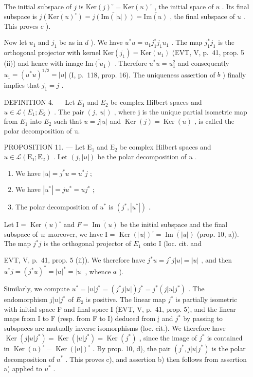 The initial subspace of \(j\) is \(\mathrm{Ker}(j)^{\circ} = \mathrm{Ker}(u)^{\circ}\) , the initial space of \(u\) . Its final subspace is \(\overline{j(\mathrm{Ker}(u)^{\circ})} = \overline{j(\mathrm{Im}(|u|))} = \overline{\mathrm{Im}(u)}\) , the final subspace of \(u\) . This proves \(c\) ).

Now let \(u_1\) and \(j_1\) be as in \(d\) ). We have \(u^*u = u_1j_1^*j_1u_1\) . The map \(j_1^*j_1\) is the orthogonal projector with kernel \(\text{Ker}(j_1) = \text{Ker}(u_1)\) (EVT, V, p.~41, prop. 5 (ii)) and hence with image \(\overline{\text{Im}(u_1)}\) . Therefore \(u^*u = u_1^2\) and consequently \(u_1 = (u^*u)^{1/2} = |u|\) (I, p.~118, prop. 16). The uniqueness assertion of \(b\) ) finally implies that \(j_1 = j\) .

DEFINITION 4. --- Let \(E_{1}\) and \(E_{2}\) be complex Hilbert spaces and \(u \in \mathcal{L}(E_{1}; E_{2})\) . The pair \((j, |u|)\) , where j is the unique partial isometric map from \(E_{1}\) into \(E_{2}\) such that \(u = j|u|\) and \(\operatorname{Ker}(j) = \operatorname{Ker}(u)\) , is called the polar decomposition of u.

PROPOSITION 11. — Let \(\mathrm{E}_1\) and \(\mathrm{E}_2\) be complex Hilbert spaces and \(u \in \mathcal{L}(\mathrm{E}_1; \mathrm{E}_2)\) . Let \((j, |u|)\) be the polar decomposition of \(u\) .

\begin{enumerate}
\def\labelenumi{\alph{enumi})}
\item
  We have \(|u| = j^{*}u = u^{*}j\) ;
\item
  We have \(|u^{*}| = j u^{*} = u j^{*}\) ;
\item
  The polar decomposition of \(u^{*}\) is \((j^{*}, |u^{*}|)\) .
\end{enumerate}

Let I = \(\operatorname{Ker}(u)^{\circ}\) and \(F = \overline{\operatorname{Im}(u)}\) be the initial subspace and the final subspace of u; moreover, we have I = \(\operatorname{Ker}(|u|)^{\circ} = \overline{\operatorname{Im}(|u|)}\) (prop. 10, a)). The map \(j^{*}j\) is the orthogonal projector of \(E_{1}\) onto I (loc. cit. and

EVT, V, p.~41, prop. 5 (ii)). We therefore have \(j^{*}u = j^{*}j|u| = |u|\) , and then \(u^{*}j = (j^{*}u)^{*} = |u|^{*} = |u|\) , whence \(a\) ).

Similarly, we compute \(u^{*} = |u|j^{*} = (j^{*}j|u|)j^{*} = j^{*}(j|u|j^{*})\) . The endomorphism \(j|u|j^{*}\) of \(E_{2}\) is positive. The linear map \(j^{*}\) is partially isometric with initial space F and final space I (EVT, V, p.~41, prop. 5), and the linear maps from I to F (resp. from F to I) deduced from j and \(j^{*}\) by passing to subspaces are mutually inverse isomorphisms (loc. cit.). We therefore have \(\operatorname{Ker}(j|u|j^{*}) = \operatorname{Ker}(|u|j^{*}) = \operatorname{Ker}(j^{*})\) , since the image of \(j^{*}\) is contained in \(\operatorname{Ker}(u)^{\circ} = \operatorname{Ker}(|u|)^{\circ}\) . By prop. 10, d), the pair \((j^{*}, j|u|j^{*})\) is the polar decomposition of \(u^{*}\) . This proves c), and assertion b) then follows from assertion a) applied to \(u^{*}\) .

